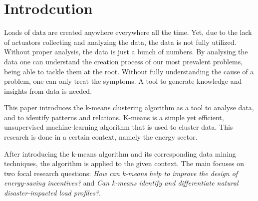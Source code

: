 \chapter{Introdcution}
\label{cha:introduction}


Loads of data are created anywhere everywhere all the time.
Yet, due to the lack of actuators collecting and analyzing the data, the data is not fully utilized.
Without proper analysis, the data is just a bunch of numbers.
By analysing the data one can understand the creation process of our most prevalent problems, being able to tackle them at the root.
Without fully understanding the cause of a problem, one can only treat the symptoms.
A tool to generate knowledge and insights from data is needed.

This paper introduces the k-means clustering algorithm as a tool to analyse data, and to identify patterns and relations.
K-means is a simple yet efficient, unsupervised machine-learning algorithm that is used to cluster data.
This research is done in a certain context, namely the energy sector.

After introducing the k-means algorithm and its corresponding data mining techniques, the algorithm is applied to the given context.
The main focuses on two focal research questions:
\textit{How can k-means help to improve the design of energy-saving incentives?} and \textit{Can k-means identify and differentiate natural disaster-impacted load profiles?}.

